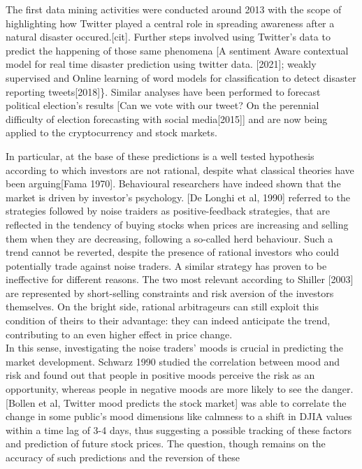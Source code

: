 \documentclass[
]{article}
\begin{document}
The first data mining activities were conducted around 2013 with the
scope of highlighting how Twitter played a central role in spreading
awareness after a natural disaster occured.{[}cit{]}. Further steps
involved using Twitter's data to predict the happening of those same
phenomena {[}A sentiment Aware contextual model for real time disaster
prediction using twitter data. {[}2021{]}; weakly supervised and Online
learning of word models for classification to detect disaster reporting
tweets{[}2018{]}\}. Similar analyses have been performed to forecast
political election's results {[}Can we vote with our tweet? On the
perennial difficulty of election forecasting with social
media{[}2015{]}{]} and are now being applied to the cryptocurrency and
stock markets.

In particular, at the base of these predictions is a well tested
hypothesis according to which investors are not rational, despite what
classical theories have been arguing{[}Fama 1970{]}. Behavioural
researchers have indeed shown that the market is driven by investor's
psychology. {[}De Longhi et al, 1990{]} referred to the strategies
followed by noise traiders as positive-feedback strategies, that are
reflected in the tendency of buying stocks when prices are increasing
and selling them when they are decreasing, following a so-called herd
behaviour. Such a trend cannot be reverted, despite the presence of
rational investors who could potentially trade against noise traders. A
similar strategy has proven to be ineffective for different reasons. The
two most relevant according to Shiller {[}2003{]} are represented by
short-selling constraints and risk aversion of the investors themselves.
On the bright side, rational arbitrageurs can still exploit this
condition of theirs to their advantage: they can indeed anticipate the
trend, contributing to an even higher effect in price change.\\
In this sense, investigating the noise traders' moods is crucial in
predicting the market development. Schwarz 1990 studied the correlation
between mood and risk and found out that people in positive moods
perceive the risk as an opportunity, whereas people in negative moods
are more likely to see the danger. {[}Bollen et al, Twitter mood
predicts the stock market{]} was able to correlate the change in some
public's mood dimensions like calmness to a shift in DJIA values within
a time lag of 3-4 days, thus suggesting a possible tracking of these
factors and prediction of future stock prices. The question, though
remains on the accuracy of such predictions and the reversion of these
\end{document}
